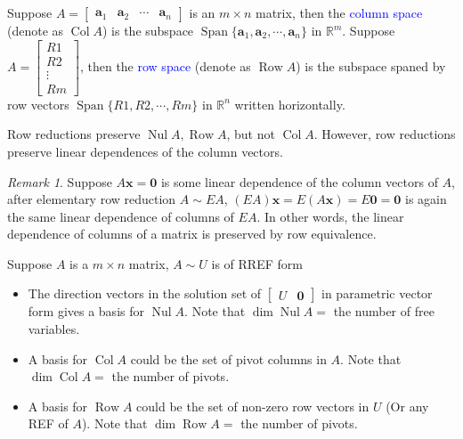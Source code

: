 \documentclass{beamer}
\DeclareMathOperator{\Nul}{Nul}
\DeclareMathOperator{\Col}{Col}
\DeclareMathOperator{\Row}{Row}
\theoremstyle{definition}
\theoremstyle{remark}
\newtheorem*{remark}{Remark}
\DeclareMathOperator{\Span}{Span}
\begin{document}
\begin{frame}[t]
\begin{definition}
Suppose $A=\begin{bmatrix}
\mathbf a_1&\mathbf a_2&\cdots&\mathbf a_n
\end{bmatrix}$ is an $m\times n$ matrix, then the \textcolor{blue}{column space} (denote as $\Col A$) is the subspace $\Span\{\mathbf a_1,\mathbf a_2,\cdots,\mathbf a_n\}$ in $\mathbb R^m$. Suppose $A=\begin{bmatrix}
R1\\R2\\\vdots\\Rm
\end{bmatrix}$, then the \textcolor{blue}{row space} (denote as $\Row A$) is the subspace spaned by row vectors $\Span\{R1,R2,\cdots, Rm\}$ in $\mathbb R^n$ written horizontally.
\end{definition}
\pause
\begin{theorem}
Row reductions preserve $\Nul A, \Row A$, but not $\Col A$. However, row reductions preserve linear dependences of the column vectors.
\end{theorem}
\pause
\begin{remark}
Suppose $A\mathbf x=\mathbf0$ is some linear dependence of the column vectors of $A$, after elementary row reduction $A\sim EA$, $(EA)\mathbf x=E(A\mathbf x)=E\mathbf0=\mathbf0$ is again the same linear dependence of columns of $EA$. In other words, the linear dependence of columns of a matrix is preserved by row equivalence.
\end{remark}
\end{frame}

\begin{frame}[t]
\begin{theorem}
Suppose $A$ is a $m\times n$ matrix, $A\sim U$ is of RREF form
\begin{itemize}
\item The direction vectors in the solution set of $\begin{bmatrix}
U&\mathbf0
\end{bmatrix}$ in parametric vector form gives a basis for $\Nul A$. Note that $\dim\Nul A=$ the number of free variables.
\item A basis for $\Col A$ could be the set of pivot columns in $A$. Note that $\dim\Col A=$ the number of pivots.
\item A basis for $\Row A$ could be the set of non-zero row vectors in $U$ (Or any REF of $A$). Note that $\dim\Row A=$ the number of pivots.
\end{itemize}
\end{theorem}
\end{frame}
\end{document}
